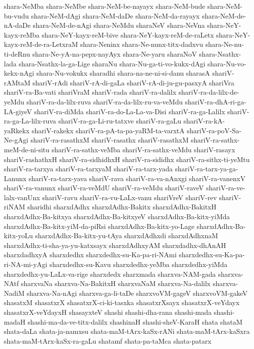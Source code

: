 {shara-NeMba
shara-NeMbe
shara-NeM-be-nayayx
shara-NeM-bude
shara-NeM-bu-vudu
shara-NeM-dAgi
shara-NeM-daDe
shara-NeM-da-rayayx
shara-NeM-de-nA-daDe
shara-NeM-de-nAgi
shara-NeMdu
sharaNeV
shara-NeVna
shara-NeY-kayx-reMba
shara-NeY-kayx-reM-bive
shara-NeY-kayx-reM-de-raLetx
shara-NeY-kayx-reM-de-ra-LetxraM
shara-Neninx
shara-Ne-nunx-titx-dadxvu
shara-Ne-nu-ti-deRnu
shara-Ne-yA-na-pepx-nayAyx
shara-Ne-yaru
sharaNoV
shara-Nsathx-lada
shara-Nsathx-la-ga-Lige
sharaNu
shara-Nu-ga-ti-vo-kukx-dAgi
shara-Nu-vo-kekx-nAgi
shara-Nu-vokukx
sharadhi
shara-na-ne-ni-si-danu
sharasA
shariV-rAMtaM
shariV-rAdi
shariV-rA-di-gaLa
shariV-rA-di-ju-gu-pasxyA
shariVra
shariV-ra-Ba-vati
shariVraM
shariV-rada
shariV-ra-dalilx
shariV-ra-da-lilx-de-yeMdu
shariV-ra-da-lilx-ruva
shariV-ra-da-lilx-ru-va-veMdu
shariV-ra-dhA-ri-ga-LA-giyeV
shariV-ra-diMda
shariV-ra-do-La-La-va-Disi
shariV-ra-ga-Lalilx
shariV-ra-ga-La-lilx-ruva
shariV-ra-ga-Li-ru-tatxve
shariV-ra-gaLu
shariV-ra-kA-yaRkekx
shariV-rakekx
shariV-ra-pA-ta-pa-yaRM-ta-varxtA
shariV-ra-poV-Sa-Ne-gAgi
shariV-ra-rasathxM
shariV-rasathx
shariV-rasathxM
shariV-ra-sathx-meM-de-ni-situ
shariV-ra-sathx-veMba
shariV-ra-sathx-veMdu
shariV-rasayx
shariV-rashathxH
shariV-ra-sidhidhxH
shariV-ra-sididhx
shariV-ra-sithx-ti-yeMtu
shariV-ra-tarxya
shariV-ra-tarxyaM
shariV-ra-tarx-yada
shariV-ra-tarx-ya-ga-Lanunx
shariV-ra-tarx-yava
shariV-rava
shariV-ra-va-nAnxgi
shariV-ra-vanenxV
shariV-ra-vanunx
shariV-ra-veMdU
shariV-ra-veMdu
shariV-raveV
shariV-ra-ve-lalx-vanUnx
shariV-ravu
shariV-ra-vu-LaLx-vanu
shariVreV
shariV-rev
shariV-riNAM
sharidhi
sharxdAdhx
sharxdAdhx-Bakitx
sharxdAdhx-BakitxH
sharxdAdhx-Ba-kitxya
sharxdAdhx-Ba-kitxyeV
sharxdAdhx-Ba-kitx-yiMda
sharxdAdhx-Ba-kitx-yiM-da-piRsi
sharxdAdhx-Ba-kitx-yo-Lage
sharxdAdhx-Ba-kitx-yoLu
sharxdAdhx-Ba-kitx-yu-tAya
sharxdAdhxdi
sharxdAdhxnaM
sharxdAdhx-ti-sha-ya-yu-katxsayx
sharxdAdhxyAM
sharxdadhx-dhAnAH
sharxdadhxyA
sharxdedhx
sharxdedhx-su-Ka-pa-ri-NAmi
sharxdedhx-su-Ka-pa-ri-NA-mi-yAgi
sharxdedhx-su-Kavu
sharxdedhx-yeMba
sharxdedhx-yiMda
sharxdedhx-yu-LaLx-va-rige
sharxdedx
sharxmada
sharxva-NAM-gada
sharxva-NAtf
sharxvaNa
sharxva-Na-BakitxH
sharxvaNaM
sharxva-Na-dalilx
sharxva-NadiM
sharxva-Na-nAgi
sharxva-ga-li-taDe
sharxvoVM-gageV
sharxvoVM-gakeV
shasatxM
shasatxrX
shasatxrX-ci-ki-tasxka
shasatxrXsayx
shasatxrX-veYdayx
shasatxrX-veYdayxH
shasayxteV
shashi
shashi-dha-rana
shashi-mada
shashi-madaH
shashi-ma-da-ve-titx-dalilx
shashinaH
shashi-sheV-KaraH
shata
shataM
shata-daLa
shata-ja-namxsu
shata-maM-tArx-kaSx-rANi
shata-maM-tArx-kaSxra
shata-maM-tArx-kaSx-ra-gaLu
shatamf
shata-pa-taMca
shata-patarx
}
